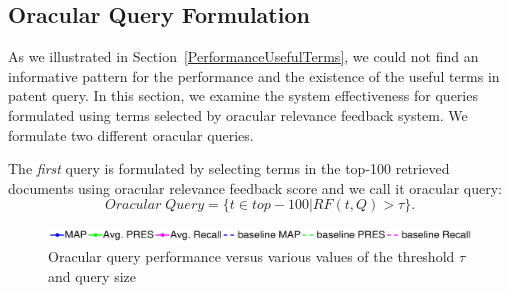 \subsection{Oracular Query Formulation}
\label{sec:OracularQueryFormulation}
As we illustrated in Section~\ref{PerformanceUsefulTerms}, we could not find an informative pattern for the performance and the existence of the useful terms in patent query.
In this section, we examine the system effectiveness for queries formulated using terms selected by oracular relevance feedback system.
We formulate two different oracular queries.

The \textit{first} query is formulated by selecting terms in the top-100 retrieved documents using oracular relevance feedback score and we call it oracular query:
\begin{equation}
Oracular \; Query = \{t \in top-100|RF(t, Q)>\tau\}.   
 \label{eq:oq}
\end{equation}
\begin{figure}[t!]
\begin{centering}
\includegraphics[width=15cm]{figs/lo}
\par\end{centering}

\begin{centering}
 \hspace*{.5cm}  
\par\end{centering} 
\protect\caption{Oracular query performance versus various values of the threshold $\tau$ and query size}
\label{fig:oracular}
\end{figure}
